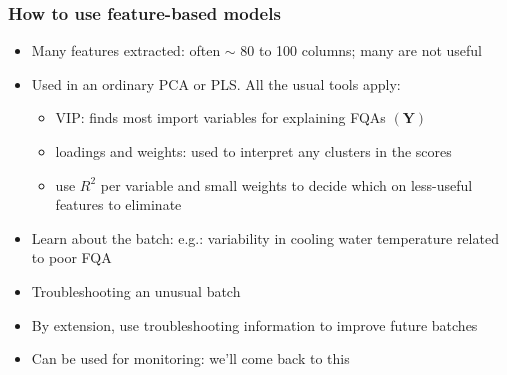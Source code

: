 \begin{frame}\frametitle{How to use feature-based models}

\begin{itemize}
	\item	Many features extracted: often \( \sim \) 80 to 100 columns; many are not useful
	
	\item	Used in an ordinary PCA or PLS.  All the usual tools apply:
	
			\begin{itemize}
				\item	VIP: finds most import variables for explaining FQAs \( (\mathbf{Y}) \)
				
				\item	loadings and weights: used to interpret any clusters in the scores
				
				\item	use \( R^2 \) per variable and small weights to decide which on less-useful features to eliminate
			\end{itemize}\pause
	
	\item	Learn about the batch: {\small e.g.: variability in cooling water temperature related to poor FQA}
	
	\item	Troubleshooting an unusual batch 

	\item	By extension, use troubleshooting information to improve future batches \pause
	
	\item	Can be used for monitoring: we'll come back to this
\end{itemize}
\end{frame}

